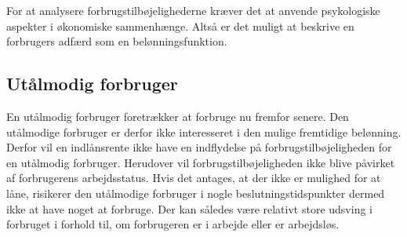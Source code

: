 
For at analysere forbrugstilbøjelighederne kræver det at anvende psykologiske aspekter i økonomiske sammenhænge. Altså er det muligt at beskrive en forbrugers adfærd som en belønningsfunktion. 



\subsection{Utålmodig forbruger}
En utålmodig forbruger foretrækker at forbruge nu fremfor senere. Den utålmodige forbruger er derfor ikke interesseret i den mulige fremtidige belønning. Derfor vil en indlånsrente ikke have en indflydelse på forbrugstilbøjeligheden for en utålmodig forbruger. Herudover vil forbrugstilbøjeligheden ikke blive påvirket af forbrugerens arbejdsstatus. Hvis det antages, at der ikke er mulighed for at låne, risikerer den utålmodige forbruger i nogle beslutningstidspunkter dermed ikke at have noget at forbruge. Der kan således være relativt store udsving i forbruget i forhold til, om forbrugeren er i arbejde eller er arbejdsløs. 






